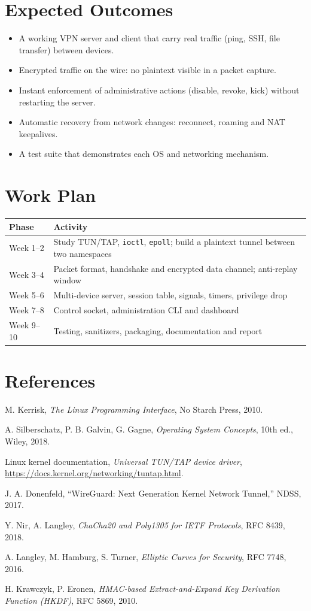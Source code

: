 \documentclass[12pt,a4paper]{article}
\begin{document}
\section{Expected Outcomes}
\begin{itemize}
  \item A working VPN server and client that carry real traffic (ping, SSH, file transfer) between devices.
  \item Encrypted traffic on the wire: no plaintext visible in a packet capture.
  \item Instant enforcement of administrative actions (disable, revoke, kick) without restarting the server.
  \item Automatic recovery from network changes: reconnect, roaming and NAT keepalives.
  \item A test suite that demonstrates each OS and networking mechanism.
\end{itemize}

\section{Work Plan}
\begin{tabularx}{\textwidth}{@{}lX@{}}
\toprule
\textbf{Phase} & \textbf{Activity}\\
\midrule
Week 1--2 & Study TUN/TAP, \texttt{ioctl}, \texttt{epoll}; build a plaintext tunnel between two namespaces\\
Week 3--4 & Packet format, handshake and encrypted data channel; anti-replay window\\
Week 5--6 & Multi-device server, session table, signals, timers, privilege drop\\
Week 7--8 & Control socket, administration CLI and dashboard\\
Week 9--10 & Testing, sanitizers, packaging, documentation and report\\
\bottomrule
\end{tabularx}

\section*{References}
\begin{enumerate}[label={[\arabic*]}]
  \item M. Kerrisk, \emph{The Linux Programming Interface}, No Starch Press, 2010.
  \item A. Silberschatz, P. B. Galvin, G. Gagne, \emph{Operating System Concepts}, 10th ed., Wiley, 2018.
  \item Linux kernel documentation, \emph{Universal TUN/TAP device driver}, \url{https://docs.kernel.org/networking/tuntap.html}.
  \item J. A. Donenfeld, ``WireGuard: Next Generation Kernel Network Tunnel,'' NDSS, 2017.
  \item Y. Nir, A. Langley, \emph{ChaCha20 and Poly1305 for IETF Protocols}, RFC 8439, 2018.
  \item A. Langley, M. Hamburg, S. Turner, \emph{Elliptic Curves for Security}, RFC 7748, 2016.
  \item H. Krawczyk, P. Eronen, \emph{HMAC-based Extract-and-Expand Key Derivation Function (HKDF)}, RFC 5869, 2010.
\end{enumerate}
\end{document}
